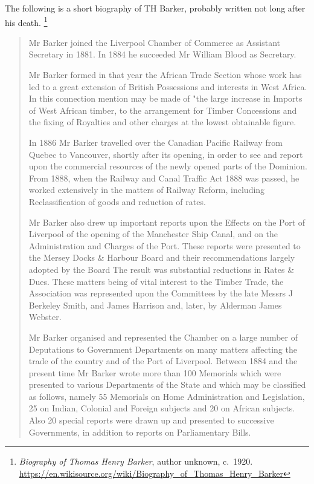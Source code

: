 The following is a short biography of TH Barker, probably written not long after his death.
\footnote{
	\emph{Biography of Thomas Henry Barker}, author unknown, c.\ 1920.
	\url{https://en.wikisource.org/wiki/Biography_of_Thomas_Henry_Barker}
}

\begin{quotation}
Mr Barker joined the Liverpool Chamber of Commerce as Assistant Secretary in 1881. In 1884 he succeeded Mr William Blood as Secretary.

Mr Barker formed in that year the African Trade Section whose work has led to a great extension of British Possessions and interests in West Africa. In this connection mention may be made of "the large increase in Imports of West African timber, to the arrangement for Timber Concessions and the fixing of Royalties and other charges at the lowest obtainable figure.

In 1886 Mr Barker travelled over the Canadian Pacific Railway from Quebec to Vancouver, shortly after its opening, in order to see and report upon the commercial resources of the newly opened parts of the Dominion. From 1888, when the Railway and Canal Traffic Act 1888 was passed, he worked extensively in the matters of Railway Reform, including Reclassification of goods and reduction of rates.

Mr Barker also drew up important reports upon the Effects on the Port of Liverpool of the opening of the Manchester Ship Canal, and on the Administration and Charges of the Port. These reports were presented to the Mersey Docks \& Harbour Board and their recommendations largely adopted by the Board The result was substantial reductions in Rates \& Dues. These matters being of vital interest to the Timber Trade, the Association was represented upon the Committees by the late Messrs J Berkeley Smith, and James Harrison and, later, by Alderman James Webster.

Mr Barker organised and represented the Chamber on a large number of Deputations to Government Departments on many matters affecting the trade of the country and of the Port of Liverpool. Between 1884 and the present time Mr Barker wrote more than 100 Memorials which were presented to various Departments of the State and which may be classified as follows, namely 55 Memorials on Home Administration and Legislation, 25 on Indian, Colonial and Foreign subjects and 20 on African subjects. Also 20 special reports were drawn up and presented to successive Governments, in addition to reports on Parliamentary Bills.


\end{quotation}
